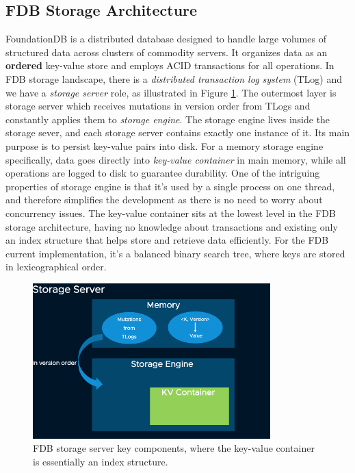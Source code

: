 \documentclass[sigplan,screen,nonacm]{acmart}
\begin{document}
\subsection{FDB Storage Architecture}
FoundationDB \cite{fdb} is a distributed database designed to handle large volumes of structured data across clusters of commodity servers. It organizes data as an \textbf{ordered} key-value store and employs ACID transactions for all operations. In FDB storage landscape, there is a {\itshape distributed transaction log system} (TLog) and we have a {\itshape storage server} role, as illustrated in Figure \ref{fig:FDB-storage-architecture}. The outermost layer is storage server which receives mutations in version order from TLogs and constantly applies them to {\itshape storage engine}. The storage engine lives inside the storage sever, and each storage server contains exactly one instance of it. Its main purpose is to persist key-value pairs into disk. For a memory storage engine specifically, data goes directly into {\itshape key-value container} in main memory, while all operations are logged to disk to guarantee durability. One of the intriguing properties of storage engine is that it’s used by a single process on one thread, and therefore simplifies the development as there is no need to worry about concurrency issues. The key-value container sits at the lowest level in the FDB storage architecture, having no knowledge about transactions and existing only an index structure that helps store and retrieve data efficiently. For the FDB current implementation, it’s a balanced binary search tree, where keys are stored in lexicographical order. 
\begin{figure}[t]
  \centering
  \includegraphics[width=\linewidth, height=6cm]{pic/FDB-storage-architecture.png}
  \setlength{\abovecaptionskip}{-10pt} 
  \setlength{\belowcaptionskip}{-7pt} 
  \caption{FDB storage server key components, where the key-value container is essentially an index structure.}
  \label{fig:FDB-storage-architecture}
\end{figure}
\end{document}
